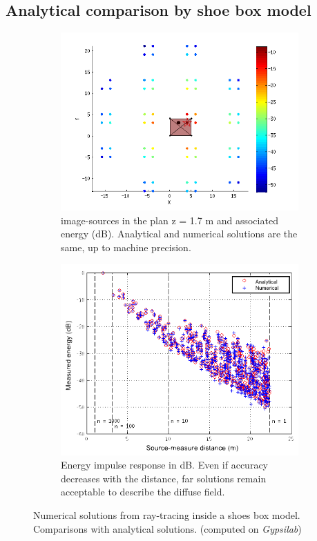 \documentclass{aes2e}
\begin{document}
\subsection{Analytical comparison by shoe box model}
\begin{figure}[t]
\centering
	\begin{subfigure}{0.47\textwidth}
		\includegraphics[width=\linewidth]{sourcesImages}
		\caption{image-sources in the plan z = 1.7 m and associated energy (dB). Analytical and numerical solutions are the same, up to machine precision.}
		\label{sourcesImages}
	\end{subfigure}
	\quad
	\begin{subfigure}{0.47\textwidth}
		\includegraphics[width=\linewidth]{boite}
		\caption{Energy impulse response in dB. Even if accuracy decreases with the distance, far solutions remain acceptable to describe the diffuse field. }
		\label{boite}
	\end{subfigure}
	\caption{Numerical solutions from ray-tracing inside a shoes box model. Comparisons with analytical solutions. (computed on \textit{Gypsilab})}
\end{figure}
\end{document}
